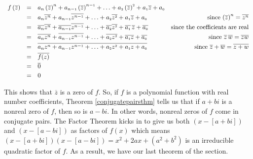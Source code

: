 \[ \begin{array}{rclr}

 f\left(\overline{z}\right) & = &  a_{n} \left(\overline{z}\right)^{n} + a_{n-\mbox{\tiny$1$}} \left(\overline{z}\right)^{n-\mbox{\tiny$1$}} + \ldots + a_{\mbox{\tiny $2$}}\left( \overline{z}\right)^{\mbox{\tiny $2$}} + a_{\mbox{\tiny $1$}} \overline{z} + a_{\mbox{\tiny $0$}} & \\ [3pt]
 
 &  = & a_{n}\overline{z^{n}} + a_{n-\mbox{\tiny$1$}}\overline{z^{n-\mbox{\tiny$1$}}} + \ldots + a_{\mbox{\tiny $2$}}\overline{z^{\mbox{\tiny $2$}}} + a_{\mbox{\tiny $1$}} \overline{z} + a_{\mbox{\tiny $0$}} & \mbox{ since $\left(\overline{z}\right)^n = \overline{z^{n}}$}\\ [3pt]
 
 & = & \overline{a_{n}}\overline{z^{n}} + \overline{a_{n-\mbox{\tiny$1$}}}\overline{z^{n-\mbox{\tiny$1$}}} + \ldots +  \overline{a_{\mbox{\tiny $2$}}}\overline{z^{\mbox{\tiny $2$}}} + \overline{a_{\mbox{\tiny $1$}}}\, \overline{z} + \overline{a_{\mbox{\tiny $0$}}} & \mbox{since the coefficients are real} \\ [3pt]
 
 & = & \overline{a_{n} z^{n}} + \overline{a_{n-\mbox{\tiny$1$}} z^{n-\mbox{\tiny$1$}}} + \ldots +  \overline{a_{\mbox{\tiny $2$}} z^{\mbox{\tiny $2$}}} + \overline{a_{\mbox{\tiny $1$}} z} + \overline{a_{\mbox{\tiny $0$}}} &  \mbox{ since $\overline{z} \, \overline{w}=\overline{zw} $}\\ [3pt]
 
 & = & \overline{a_{n} z^{n} + a_{n-\mbox{\tiny$1$}} z^{n-\mbox{\tiny$1$}} + \ldots + a_{\mbox{\tiny $2$}} z^{\mbox{\tiny $2$}} + a_{\mbox{\tiny $1$}} z + a_{\mbox{\tiny $0$}}} & \mbox{ since $ \overline{z} + \overline{w} = \overline{z+w} $}\\ [3pt]
 
 & = & \overline{f(z)} & \\ [3pt]
 
 & = & \overline{0} & \\ [3pt]
 
 & = & 0 & \\
 
\end{array} \]

This shows that $\overline{z}$ is a zero of $f$.  So, if $f$ is a polynomial function with real number coefficients, Theorem \ref{conjugatepairsthm} tells us that if $a+bi$ is a nonreal zero of $f$, then so is $a-bi$.  In other words, nonreal zeros of $f$ come in conjugate pairs.  The Factor Theorem kicks in to give us both $(x-[a+bi])$ and $(x-[a-bi])$ as factors of $f(x)$ which means $(x-[a+bi])(x-[a-bi]) = x^2 + 2a x + \left(a^2+b^2\right)$ is an irreducible quadratic factor of $f$.  As a result, we have our last theorem of the section.

